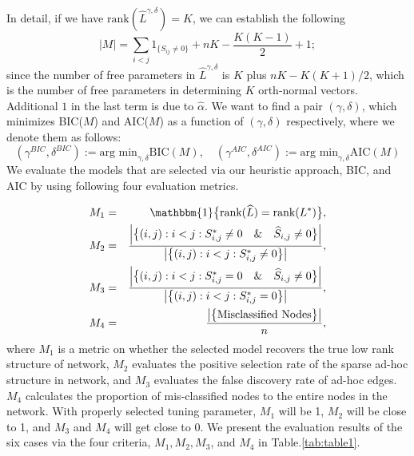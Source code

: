 \documentclass[AMS,STIX1COL]{WileyNJD-v2}
\begin{document}
{In detail, if we have $\text{rank}(\widehat{L}^{\gamma,\delta})=K$, we can establish the following
\[
|M| = \sum_{i < j}1_{\{S_{ij} \neq 0\}} + n K - \frac{K(K-1)}{2} + 1 ;
\]
since the number of free parameters in $\widehat{L}^{\gamma,\delta}$ is $K$ plus $nK - K(K+1)/2$, which is the number of free parameters in determining $K$ orth-normal vectors.
Additional $1$ in the last term is due to $\hat{\alpha}$.
We want to find a pair $(\gamma,\delta)$, which minimizes BIC($M$) and AIC($M$) as a function of $(\gamma,\delta)$ respectively, where we denote them as follows:
\[
    (\gamma^{BIC},\delta^{BIC}):= \mbox{arg min}_{\gamma, \delta}
    \mbox{BIC}(M),
    \quad
    (\gamma^{AIC},\delta^{AIC}):= \mbox{arg min}_{\gamma, \delta}
    \mbox{AIC}(M)
\]
We evaluate the models that are selected via our heuristic approach, BIC, and AIC by using following four evaluation metrics.

\begin{eqnarray*}
M_1 &=& \mathbbm{1}\big\{\mbox{rank}(\widehat{L}) = \mbox{rank}(L^{*})\big\}, \\
M_2 &=& \frac{\left|\big\{(i,j):i<j:S^{*}_{i,j} \neq0 \quad \& \quad \widehat{S}_{i,j} \neq 0 \big\}\right|}{\left|\big\{(i,j):i<j:S^{*}_{i,j}\neq0\big\}\right|}, \\
M_3 &=& \frac{\left|\big\{(i,j):i<j:S^{*}_{i,j} = 0 \quad \& \quad \widehat{S}_{i,j} \neq 0 \big\}\right|}{\left|\big\{(i,j):i<j:S^{*}_{i,j}=0\big\}\right|}, \\
M_4 &=& \frac{\left|\big\{\mbox{Misclassified Nodes}\big\}\right|}{n},
\end{eqnarray*}
where $M_1$ is a metric on whether the selected model recovers the true low rank structure of network,
$M_2$ evaluates the positive selection rate of the sparse ad-hoc structure in network,
and $M_3$ evaluates the false discovery rate of ad-hoc edges.
$M_4$ calculates the proportion of mis-classified nodes to the entire nodes in the network.
With properly selected tuning parameter, $M_1$ will be 1, $M_2$ will be close to 1, and $M_3$ and $M_4$ will get close to 0.
We present the evaluation results of the six cases via the four criteria, $M_1,M_2,M_3$, and $M_4$ in Table.\ref{tab:table1}.

}
\end{document}
